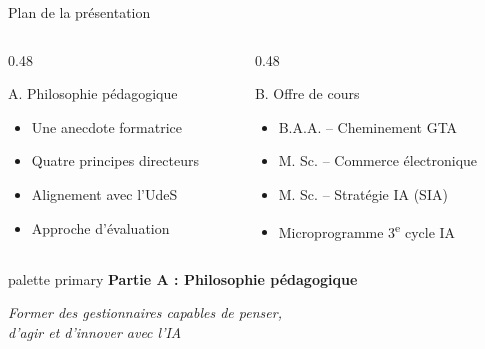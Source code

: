 \documentclass[aspectratio=169,11pt]{beamer}
\begin{document}
\begin{frame}{Plan de la présentation}
  \begin{columns}[T]
    \begin{column}{0.48\textwidth}
      \begin{block}{A. Philosophie pédagogique}
        \begin{itemize}
          \item Une anecdote formatrice
          \item Quatre principes directeurs
          \item Alignement avec l'UdeS
          \item Approche d'évaluation
        \end{itemize}
      \end{block}
    \end{column}
    \begin{column}{0.48\textwidth}
      \begin{block}{B. Offre de cours}
        \begin{itemize}
          \item B.A.A. -- Cheminement GTA
          \item M. Sc. -- Commerce électronique
          \item M. Sc. -- Stratégie IA (SIA)
          \item Microprogramme 3\textsuperscript{e} cycle IA
        \end{itemize}
      \end{block}
    \end{column}
  \end{columns}
\end{frame}

\begin{frame}{}
  \begin{beamercolorbox}[wd=\paperwidth,ht=2.5cm,dp=0.5cm,center]{palette primary}
    {\Large\bfseries Partie A : Philosophie pédagogique}
  \end{beamercolorbox}
  \vspace{2cm}
  \begin{center}
    {\large\textit{Former des gestionnaires capables de penser,\\d'agir et d'innover avec l'IA}}
  \end{center}
\end{frame}
\end{document}
